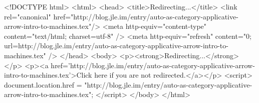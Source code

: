 <!DOCTYPE html>
<html>
<head>
<title>Redirecting...</title>
<link rel="canonical" href="http://blog.jle.im/entry/auto-as-category-applicative-arrow-intro-to-machines.tex"/>
<meta http-equiv="content-type" content="text/html; charset=utf-8" />
<meta http-equiv="refresh" content="0; url=http://blog.jle.im/entry/auto-as-category-applicative-arrow-intro-to-machines.tex" />
</head>
<body>
  <p><strong>Redirecting...</strong></p>
  <p><a href='http://blog.jle.im/entry/auto-as-category-applicative-arrow-intro-to-machines.tex'>Click here if you are not redirected.</a></p>
  <script>
    document.location.href = "http://blog.jle.im/entry/auto-as-category-applicative-arrow-intro-to-machines.tex";
  </script>
</body>
</html>
